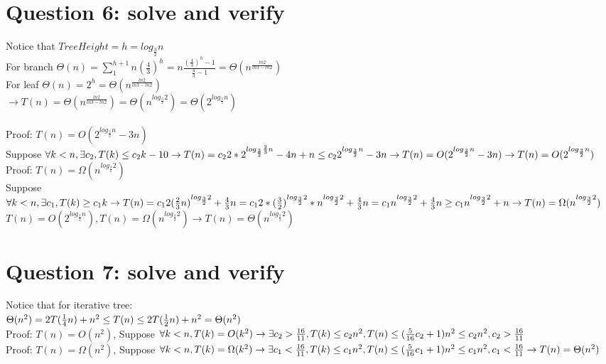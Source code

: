 \documentclass[]{article}
\begin{document}
\section{Question 6: solve and verify}
Notice that $TreeHeight=h = log_{\frac{3}{2}}n$\\
For branch $\Theta(n) = \sum _{1}^{h + 1} n(\frac{4}{3})^h = n\frac{(\frac{4}{3})^h - 1}{\frac{4}{3} - 1} = \Theta(n^{\frac{ln2}{ln3-ln2}})$\\
For leaf $\Theta(n) = 2^h = \Theta(n^{\frac{ln2}{ln3-ln2}})$\\
$\rightarrow T(n) = \Theta(n^{\frac{ln2}{ln3-ln2}}) = \Theta(n^{log_{\frac{3}{2}}2}) = \Theta(2^{log_{\frac{3}{2}}n})$\\
\\
Proof: $ T(n) = O(2^{log_{\frac{3}{2}}n} - 3n)$ \\
Suppose $\forall k<n, \exists c_{2}, T(k) \le c_{2}k - 10\\
\rightarrow T(n) = c_{2}2*2^{log_{\frac{3}{2}}\frac{2}{3}n} -4n + n \le c_{2}2^{log_{\frac{3}{2}}n} -3n\\
\rightarrow T(n) =  O(2^{log_{\frac{3}{2}}n} -3n)\\
\rightarrow T(n) =  O(2^{log_{\frac{3}{2}}n})\\$
\\
Proof: $ T(n) = \Omega(n^{log_{\frac{3}{2}}2})$ \\
Suppose $\forall k<n, \exists c_{1}, T(k) \ge c_{1}k\\
\rightarrow T(n) = c_{1}2(\frac{2}{3}n)^{log_{\frac{3}{2}}2} + \frac{4}{3}n
 = c_{1}2*(\frac{3}{2})^{log_{\frac{3}{2}}2}*n^{log_{\frac{3}{2}}2} + \frac{4}{3}n = c_{1}n^{log_{\frac{3}{2}}2} + \frac{4}{3}n \ge c_{1}n^{log_{\frac{3}{2}}2} + n\\
\rightarrow T(n) = \Omega(n^{log_{\frac{3}{2}}2})\\$
\\
$T(n) =  O(2^{log_{\frac{3}{2}}n}), T(n) = \Omega(n^{log_{\frac{3}{2}}2}) \rightarrow T(n) = \Theta(n^{log_{\frac{3}{2}}2})$
\section{Question 7: solve and verify}

Notice that for iterative tree: \\
$\Theta (n^2) = 2T(\frac{1}{4}n) + n^2 \le T(n) \le 2T(\frac{1}{2}n) + n^2 = \Theta (n^2)\\$
\\
Proof: $T(n) = O(n^2)$, Suppose $\forall k < n, T(k) = O(k^2)\\
\rightarrow \exists c_{2}>\frac{16}{11}, T(k) \le c_{2}n^2, T(n) \le (\frac{5}{16}c_{2} + 1)n^{2} \le c_{2}n^2, c_{2}>\frac{16}{11} \\$
\\
Proof: $T(n) = \Omega(n^2)$, Suppose $\forall k < n, T(k) = \Omega(k^2)\\
\rightarrow \exists c_{1}<\frac{16}{11}, T(k) \le c_{1}n^2, T(n) \le (\frac{5}{16}c_{1} + 1)n^{2} \le c_{1}n^2, c_{1}<\frac{16}{11} \\
\rightarrow T(n) = \Theta(n^2)$\\
\end{document}
